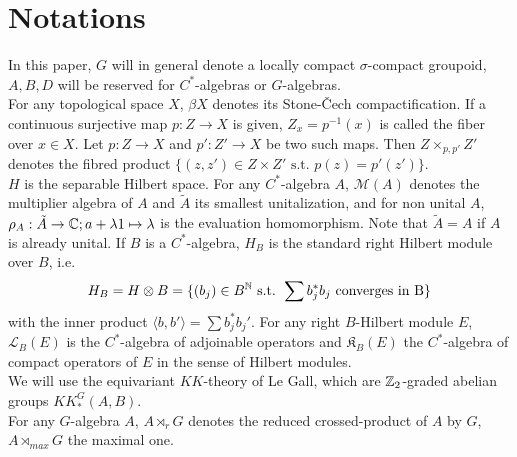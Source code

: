 \section{Notations}

In this paper, $G$ will in general denote a locally compact $\sigma$-compact groupoid, $A,B,D$ will be reserved for $C^*$-algebras or $G$-algebras.\\

For any topological space $X$, $\beta X$ denotes its Stone-\v{C}ech compactification. If a continuous surjective map $p : Z\rightarrow X $ is given, $Z_x = p^{-1}(x)$ is called the fiber over $x\in X$. Let $p : Z\rightarrow X $ and $p' : Z'\rightarrow X $ be two such maps. Then $Z\times_{p,p'} Z'$ denotes the fibred product $\{(z,z')\in Z\times Z' \text{ s.t. } p(z)=p'(z')\}$. \\ 

$H$ is the separable Hilbert space. For any $C^*$-algebra $A$, $\mathcal M(A)$ denotes the multiplier algebra of $A$ and $\tilde A$ its smallest unitalization, and for non unital $A$, $\rho_A : \tilde A \rightarrow \mathbb C; a+\lambda 1 \mapsto \lambda$ is the evaluation homomorphism. Note that $\tilde A=A$ if $A$ is already unital. If $B$ is a $C^*$-algebra, $H_B$ is the standard right Hilbert module over $B$, i.e. \[H_B= H\otimes B=\{(b_j)\in B^\mathbb N \text{ s.t. }\sum b_j^* b_j \text{ converges in B}\}\] with the inner product $\langle b, b'\rangle = \sum b_j^* b_j'$. For any right $B$-Hilbert module $E$, $\mathcal L_B(E)$ is the $C^*$-algebra of adjoinable operators and $\mathfrak K_B(E)$ the $C^*$-algebra of compact operators of $E$ in the sense of Hilbert modules.\\

We will use the equivariant $KK$-theory of Le Gall, which are $\mathbb Z_2$-graded abelian groups $KK^G_*(A,B)$.\\

For any $G$-algebra $A$, $A\rtimes_r G$ denotes the reduced crossed-product of $A$ by $G$, $A\rtimes_{max} G$ the maximal one. 
